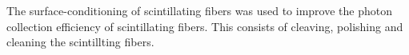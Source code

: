 The surface-conditioning of scintillating fibers was used to improve the photon collection efficiency of scintillating fibers. This consists of cleaving, polishing and cleaning the scintillting fibers.

